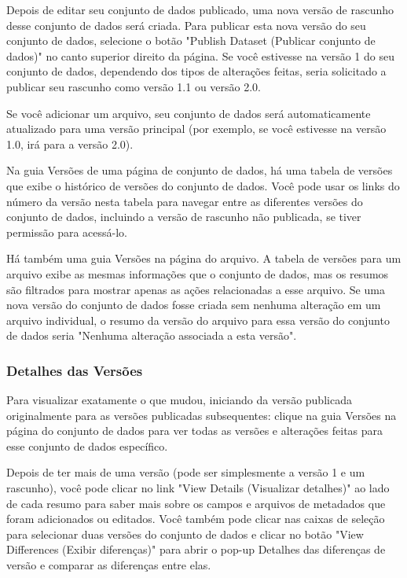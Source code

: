 \documentclass[12pt,hidelinks]{article}
\begin{document}
Depois de editar seu conjunto de dados publicado, uma nova versão de rascunho desse conjunto de dados será criada. Para publicar esta nova versão do seu conjunto de dados, selecione o botão "Publish Dataset (Publicar conjunto de dados)" no canto superior direito da página. Se você estivesse na versão 1 do seu conjunto de dados, dependendo dos tipos de alterações feitas, seria solicitado a publicar seu rascunho como versão 1.1 ou versão 2.0.

Se você adicionar um arquivo, seu conjunto de dados será automaticamente \\atualizado para uma versão principal (por exemplo, se você estivesse na versão 1.0, irá para a versão 2.0).

Na guia Versões de uma página de conjunto de dados, há uma tabela de versões que exibe o histórico de versões do conjunto de dados. Você pode usar os links do número da versão nesta tabela para navegar entre as diferentes versões do conjunto de dados, incluindo a versão de rascunho não publicada, se tiver permissão para acessá-lo.

Há também uma guia Versões na página do arquivo. A tabela de versões para um arquivo exibe as mesmas informações que o conjunto de dados, mas os resumos são filtrados para mostrar apenas as ações relacionadas a esse arquivo. Se uma nova versão do conjunto de dados fosse criada sem nenhuma alteração em um arquivo individual, o resumo da versão do arquivo para essa versão do conjunto de dados seria "Nenhuma alteração associada a esta versão".
    
         \subsubsection{Detalhes das Versões}
         
\qquad Para visualizar exatamente o que mudou, iniciando da versão publicada originalmente para as versões publicadas subsequentes: clique na guia Versões na página do conjunto de dados para ver todas as versões e alterações feitas para esse conjunto de dados específico.

Depois de ter mais de uma versão (pode ser simplesmente a versão 1 e um rascunho), você pode clicar no link "View Details (Visualizar detalhes)" ao lado de cada resumo para saber mais sobre os campos e arquivos de metadados que foram adicionados ou editados. Você também pode clicar nas caixas de seleção para selecionar duas versões do conjunto de dados e clicar no botão "View Differences (Exibir diferenças)" para abrir o pop-up Detalhes das diferenças de versão e comparar as diferenças entre elas.
         
\end{document}
